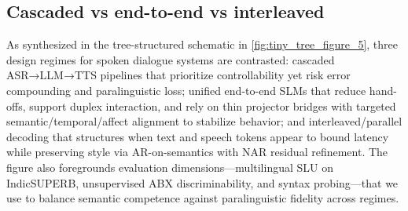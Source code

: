 \subsection{Cascaded vs end-to-end vs interleaved} \label{subsec:Cascaded vs end-to-end vs interleaved}
As synthesized in the tree-structured schematic in \autoref{fig:tiny_tree_figure_5}, three design regimes for spoken dialogue systems are contrasted: cascaded ASR→LLM→TTS pipelines that prioritize controllability yet risk error compounding and paralinguistic loss; unified end-to-end SLMs that reduce hand-offs, support duplex interaction, and rely on thin projector bridges with targeted semantic/temporal/affect alignment to stabilize behavior; and interleaved/parallel decoding that structures when text and speech tokens appear to bound latency while preserving style via AR-on-semantics with NAR residual refinement. The figure also foregrounds evaluation dimensions—multilingual SLU on IndicSUPERB, unsupervised ABX discriminability, and syntax probing—that we use to balance semantic competence against paralinguistic fidelity across regimes.

